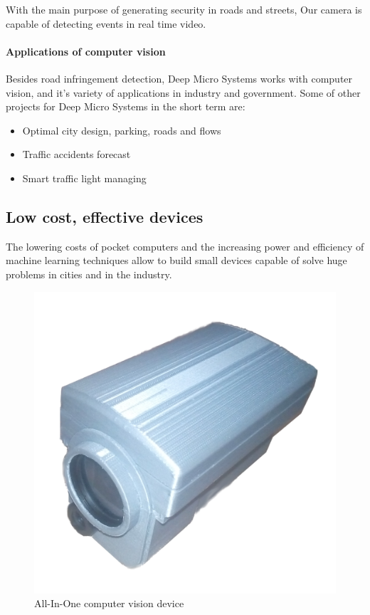 \documentclass[fleqn,12pt]{SelfArx} %
\begin{document}
With the main purpose of generating security in roads and streets, Our camera is capable of detecting events in real time video.

\paragraph{Applications of computer vision} Besides road infringement detection, Deep Micro Systems works with computer vision, and it's variety of applications in industry and government. Some of other projects for Deep Micro Systems in the short term are:

\begin{itemize}[noitemsep] %
\item Optimal city design, parking, roads and flows
\item Traffic accidents forecast
\item Smart traffic light managing
\end{itemize}

\subsection{Low cost, effective devices}

The lowering costs of pocket computers and the increasing power and efficiency of machine learning techniques allow to build small devices capable of solve huge problems in cities and in the industry.

\begin{figure}[ht]\centering
\includegraphics[width=\linewidth]{images/lucam_005}
\caption{All-In-One computer vision device}
\label{fig:results}
\end{figure}
\end{document}
